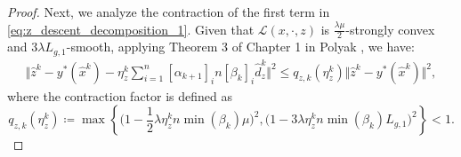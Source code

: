 \documentclass{article}
\theoremstyle{plain}
\theoremstyle{definition}
\theoremstyle{remark}
\begin{document}
\begin{proof}
Next, we analyze the contraction of the first term in \eqref{eq:z_descent_decomposition_1}. Given that $\mathcal{L}(x,  \cdot,z)$ is $\frac{\lambda\mu}{2}$-strongly convex and $3\lambda L_{g,1}$-smooth, applying Theorem 3 of Chapter 1 in Polyak , we have:
\begin{align}\label{eq:z_contraction_step}
    \bigg\Vert\hat{z}^{k}- y^*(\hat{x}^{k})- \eta_z^{k}\sum_{i=1}^{n}[\alpha_{k+1}]_{i}n[\beta_{k}]_{i}\hat{d}_{z}^{k}\bigg\Vert^{2}
    \leq q_{z,k}(\eta_{z}^{k})\big\Vert\hat{z}^{k}- y^*(\hat{x}^{k})\big\Vert^{2},
\end{align}
where the contraction factor is defined as
\begin{equation*}
    q_{z,k}(\eta_{z}^{k}) \coloneqq \max\left\{ \big(1-\frac{1}{2}\lambda\eta_{z}^{k} n\min(\beta_{k})\mu\big)^{2}, \big(1-3\lambda\eta_{z}^{k} n\min(\beta_{k})L_{g,1}\big)^{2} \right\} < 1.
\end{equation*}


\end{proof}
\end{document}
